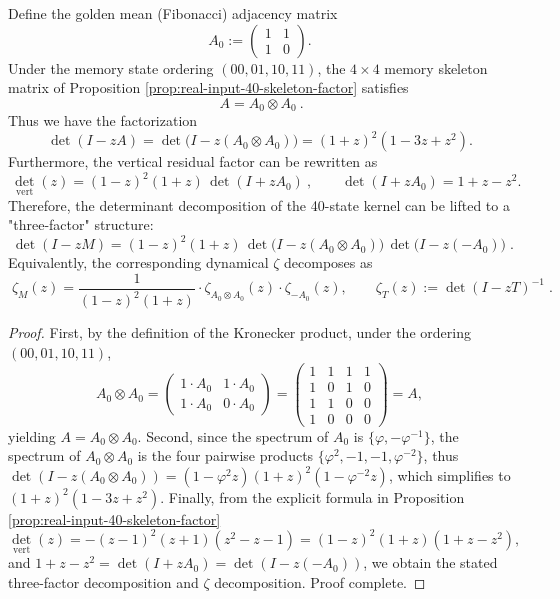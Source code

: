 \begin{proposition}\label{prop:real-input-40-A0-tensor-hidden}
Define the golden mean (Fibonacci) adjacency matrix
\[
A_0:=\begin{pmatrix}1&1\\[2pt]1&0\end{pmatrix}.
\]
Under the memory state ordering \((00,01,10,11)\), the $4\times 4$ memory skeleton matrix of Proposition \ref{prop:real-input-40-skeleton-factor} satisfies
\[
\boxed{\ A=A_0\otimes A_0\ }.
\]
Thus we have the factorization
\[
\det(I-zA)=\det\!\bigl(I-z(A_0\otimes A_0)\bigr)
=(1+z)^2(1-3z+z^2).
\]
Furthermore, the vertical residual factor can be rewritten as
\[
\boxed{\ \det_{\mathrm{vert}}(z)=(1-z)^2(1+z)\,\det(I+zA_0)\ },
\qquad
\det(I+zA_0)=1+z-z^2.
\]
Therefore, the determinant decomposition of the 40-state kernel can be lifted to a "three-factor" structure:
\[
\boxed{\;
\det(I-zM)
=(1-z)^2(1+z)\,
\det\!\bigl(I-z(A_0\otimes A_0)\bigr)\,
\det\!\bigl(I-z(-A_0)\bigr)\; }.
\]
Equivalently, the corresponding dynamical \(\zeta\) decomposes as
\[
\boxed{\;
\zeta_M(z)=\frac{1}{(1-z)^2(1+z)}\cdot
\zeta_{A_0\otimes A_0}(z)\cdot
\zeta_{-A_0}(z),\qquad
\zeta_T(z):=\det(I-zT)^{-1}\; }.
\]
\end{proposition}

\begin{proof}
First, by the definition of the Kronecker product, under the ordering \((00,01,10,11)\),
\[
A_0\otimes A_0=
\begin{pmatrix}
1\cdot A_0 & 1\cdot A_0\\
1\cdot A_0 & 0\cdot A_0
\end{pmatrix}
=
\begin{pmatrix}
1&1&1&1\\
1&0&1&0\\
1&1&0&0\\
1&0&0&0
\end{pmatrix}=A,
\]
yielding \(A=A_0\otimes A_0\).
Second, since the spectrum of \(A_0\) is \(\{\varphi,-\varphi^{-1}\}\), the spectrum of \(A_0\otimes A_0\) is the four pairwise products
\(\{\varphi^2,-1,-1,\varphi^{-2}\}\), thus
\(\det(I-z(A_0\otimes A_0))=(1-\varphi^2 z)(1+\!z)^2(1-\varphi^{-2}z)\), which simplifies to \((1+z)^2(1-3z+z^2)\).
Finally, from the explicit formula in Proposition \ref{prop:real-input-40-skeleton-factor}
\[
\det_{\mathrm{vert}}(z)=-(z-1)^2(z+1)(z^2-z-1)
=(1-z)^2(1+z)(1+z-z^2),
\]
and \(1+z-z^2=\det(I+zA_0)=\det(I-z(-A_0))\), we obtain the stated three-factor decomposition and \(\zeta\) decomposition. Proof complete.
\end{proof}

